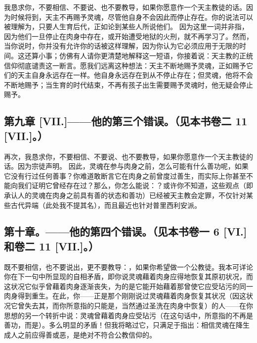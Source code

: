 我恳求你，不要相信、不要说、也不要教导，如果你愿意作一个天主教徒的话。因为时候将到，天主不再赐予灵魂，尽管他自身不会因此而停止存在。你的说法可以被理解为，只要人生育后代，正如论到某些人所说他们。 因为这里一词并非指，因为他们一旦停止在肉身中存在，或开始遭受地狱的火刑，就不再学习了。然而，当你说时，你并没有允许你的话被这样理解，因为你认为它必须应用于无限的时间。这还算小事；仿佛有人请你更清楚地解释这一短语，你接着说：天主教的正统信仰彻底谴责这一断言。愿我们远离这种想法：天主不断地赐予灵魂，正如赐予它们的天主自身永远存在一样。他自身永远存在到从不停止存在；但灵魂，他将不会不断地赐予；当生育的时代结束，不再有孩子出生需要赐予灵魂时，他无疑会停止赐予。\par


\subsection{第九章 [VII.]——他的第三个错误。（见本书卷二 11 [VII.]。）}

再次，我恳求你，不要相信、不要说、也不要教导，如果你愿意作一个天主教徒的话。因为宗徒声明。 因此，灵魂在参与肉身之前，怎么可能有什么善功呢，如果它没有行过任何善事？你难道敢断言它在肉身之前曾度过善生，而实际上你甚至不能向我们证明它曾经存在过？那么，你怎么能说：？或许你不知道，这些观点（即承认人的灵魂在肉身之前具有善的状态和善功）已经被天主教会定罪，不仅针对某些古代异端（此处我不提其名），而且最近也针对普里西利安派。\par


\subsection{第十章。——他的第四个错误。（见本书卷一 6 [VI.]和卷二 11 [VII.]。）}

既不要相信，也不要说出，更不要教导：，如果你希望做一个公教徒。我本可详论你在下一句中所显现的自相矛盾，即你说灵魂藉着肉身应得地恢复其原初状况，而这状况它似乎曾藉着肉身逐渐丧失，为的是它能开始藉着那曾使它应受玷污的同一肉身得到重生。在此，你——正是那个刚刚说过灵魂藉着肉身恢复其状况（因这状况它曾失去其，而你所意指的只能是，当然通过圣洗在肉身中恢复）的人——在你思想的另一个转折中说：灵魂曾藉着肉身应受玷污（在这句话中，所意指的不再是善功，而是）。多么明显的矛盾！但我将略过它，只满足于指出：相信灵魂在降生成人之前应得善或恶，是绝对不符合公教信仰的。\par

